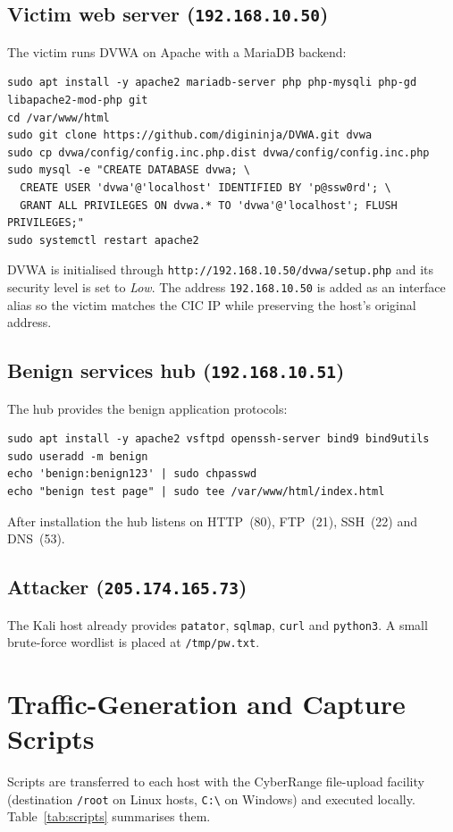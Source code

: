 \documentclass[11pt]{article}
\begin{document}
\subsection{Victim web server (\texttt{192.168.10.50})}
The victim runs DVWA on Apache with a MariaDB backend:
\begin{lstlisting}
sudo apt install -y apache2 mariadb-server php php-mysqli php-gd libapache2-mod-php git
cd /var/www/html
sudo git clone https://github.com/digininja/DVWA.git dvwa
sudo cp dvwa/config/config.inc.php.dist dvwa/config/config.inc.php
sudo mysql -e "CREATE DATABASE dvwa; \
  CREATE USER 'dvwa'@'localhost' IDENTIFIED BY 'p@ssw0rd'; \
  GRANT ALL PRIVILEGES ON dvwa.* TO 'dvwa'@'localhost'; FLUSH PRIVILEGES;"
sudo systemctl restart apache2
\end{lstlisting}
DVWA is initialised through \texttt{http://192.168.10.50/dvwa/setup.php} and its
security level is set to \emph{Low}. The address \texttt{192.168.10.50} is added
as an interface alias so the victim matches the CIC IP while preserving the
host's original address.

\subsection{Benign services hub (\texttt{192.168.10.51})}
The hub provides the benign application protocols:
\begin{lstlisting}
sudo apt install -y apache2 vsftpd openssh-server bind9 bind9utils
sudo useradd -m benign
echo 'benign:benign123' | sudo chpasswd
echo "benign test page" | sudo tee /var/www/html/index.html
\end{lstlisting}
After installation the hub listens on HTTP~(80), FTP~(21), SSH~(22) and DNS~(53).

\subsection{Attacker (\texttt{205.174.165.73})}
The Kali host already provides \texttt{patator}, \texttt{sqlmap}, \texttt{curl}
and \texttt{python3}. A small brute-force wordlist is placed at
\texttt{/tmp/pw.txt}.

\section{Traffic-Generation and Capture Scripts}
Scripts are transferred to each host with the CyberRange file-upload facility
(destination \texttt{/root} on Linux hosts, \texttt{C:\textbackslash} on Windows)
and executed locally. Table~\ref{tab:scripts} summarises them.
\end{document}
